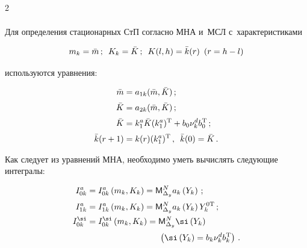 \begin{multicols}{2}
\begin{multline*}

    \end{multline*}



Для определения стационарных СтП согласно МНА и~МСЛ с~характеристиками

    \begin{equation*}

    m_k = \bar m\,; \enskip K_k =\bar K\,; \enskip K(l,h) = \bar k(r)\enskip (r=h-l) %

    \end{equation*}

используются уравнения:

    \begin{align*}

    \bar m &= a_{1k} (\bar m,\bar K)\,; %

    \\[2pt]

    \bar K &= a_{2k} (\bar m, \bar K)\,;%

    \\[2pt]

    \bar K &= k_1^a \bar K (k_1^a)^{\mathrm{T}} + b_0 \nu_k^d b_0^{\mathrm{T}}\,; %

    \\[2pt]

    \bar k(r+1)&= k(r) (k_1^a)^{\mathrm{T}}\,,\enskip \bar k(0)=\bar K\,. %

        \end{align*}



Как следует из уравнений МНА, необходимо уметь вычислять следующие интегралы:

    \begin{align}

    I_{0k}^a &= I_{0k}^a\left (m_k, K_k\right) = {\sf M}_{\Delta_y}^N a_k \left(Y_k\right)\,;\label{e3.33-s}\\[2pt]

   I_{1k}^a &= I_{1k}^a \left(m_k, K_k\right) = {\sf M}_{\Delta_y}^N a_k \left(Y_k\right) Y_k^{0\mathrm{T}}\,;\label{e3.34-s}

\\

   I_{0k}^\si &= I_{0k}^\si \left(m_k, K_k\right) ={\sf M}_{\Delta_y}^N \si \left(Y_k\right)\notag\\[2pt]

   &\hspace*{30mm}\left(\si \left(Y_k\right) = b_k \nu_k^d b_k^{\mathrm{T}}\right)\,.\notag %


\end{align}
\end{multicols}

